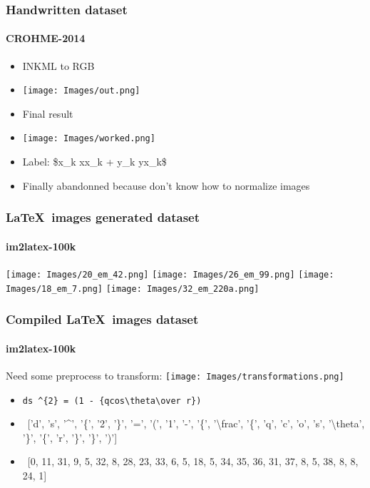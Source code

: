 \documentclass{beamer}
\begin{document}
\begin{frame}

    \frametitle{Handwritten dataset}
    \framesubtitle{\hfill CROHME-2014}
    
\begin{center}
\begin{itemize}[label=$\bullet$]
  \item INKML to RGB
  \item \texttt{[image: Images/out.png]}
  \item Final result
  \item \texttt{[image: Images/worked.png]}
  \item Label: \$x\_k xx\_k + y\_k yx\_k\$
  \item Finally abandonned because don't know how to normalize images
\end{itemize}
\end{center}

\end{frame}

\begin{frame}

    \frametitle{\LaTeX~images generated dataset}
    \framesubtitle{\hfill im2latex-100k}
    
\texttt{[image: Images/20\_em\_42.png]}
\texttt{[image: Images/26\_em\_99.png]}
\texttt{[image: Images/18\_em\_7.png]}
\texttt{[image: Images/32\_em\_220a.png]}

\end{frame}

\begin{frame}

    \frametitle{Compiled \LaTeX~images dataset}
    \framesubtitle{\hfill im2latex-100k}

Need some preprocess to transform:
\newline
\texttt{[image: Images/transformations.png]}
\begin{itemize}[label=$\bullet$]
    \item
        \texttt{ds \textasciicircum\{2\} = (1 - \{qcos{\textbackslash}theta{\textbackslash}over r\})}
    \item
        ~['d', 's', '\textasciicircum', '\{', '2', '\}', '=', '(', '1', '-', '\{', '{\textbackslash}frac', '\{', 'q', 'c', 'o', 's', '{\textbackslash}theta', '\}', '\{', 'r', '\}', '\}', ')']
    \item
        ~[0, 11, 31, 9, 5, 32, 8, 28, 23, 33, 6, 5, 18, 5, 34, 35, 36, 31, 37, 8, 5, 38, 8, 8, 24, 1]
\end{itemize}

\end{frame}
\end{document}
